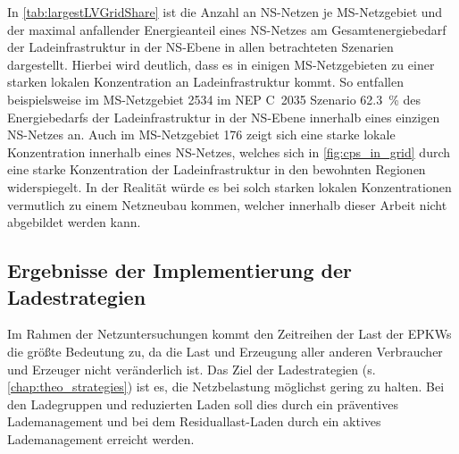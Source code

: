 


In \autoref{tab:largestLVGridShare} ist die Anzahl an \gls{NS}-Netzen je \gls{MS}-Netzgebiet und der maximal anfallender Energieanteil eines \gls{NS}-Netzes am Gesamtenergiebedarf der Ladeinfrastruktur in der \gls{NS}-Ebene in allen betrachteten Szenarien dargestellt.
Hierbei wird deutlich, dass es in einigen \gls{MS}-Netzgebieten zu einer starken lokalen Konzentration an Ladeinfrastruktur kommt.
So entfallen beispielsweise im \gls{MS}-Netzgebiet \num{2534} im NEP C~\num{2035} Szenario \SI{62.3}{\percent} des Energiebedarfs der Ladeinfrastruktur in der \gls{NS}-Ebene innerhalb eines einzigen \gls{NS}-Netzes an.
Auch im \gls{MS}-Netzgebiet \num{176} zeigt sich eine starke lokale Konzentration innerhalb eines \gls{NS}-Netzes, welches sich in \autoref{fig:cps_in_grid} durch eine starke Konzentration der Ladeinfrastruktur in den bewohnten Regionen widerspiegelt.
In der Realität würde es bei solch starken lokalen Konzentrationen vermutlich zu einem Netzneubau kommen, welcher innerhalb dieser Arbeit nicht abgebildet werden kann.




\subsection{Ergebnisse der Implementierung der Ladestrategien}\label{chap:results_charging_strategies}

Im Rahmen der Netzuntersuchungen kommt den Zeitreihen der Last der \glspl{EPKW} die größte Bedeutung zu, da die Last und Erzeugung aller anderen Verbraucher und Erzeuger nicht veränderlich ist.
Das Ziel der Ladestrategien (s. \autoref{chap:theo_strategies}) ist es, die Netzbelastung möglichst gering zu halten.
Bei den Ladegruppen und reduzierten Laden soll dies durch ein präventives Lademanagement und bei dem Residuallast-Laden durch ein aktives Lademanagement erreicht werden.



